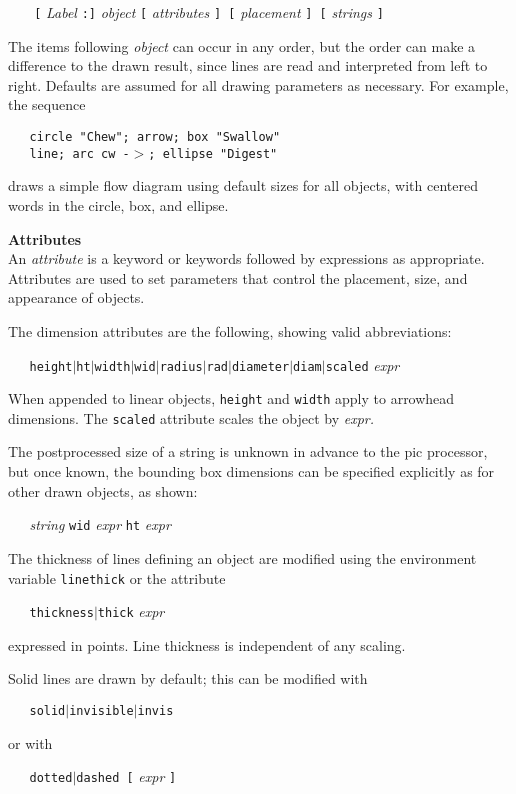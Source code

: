{\it \ \ \ }
{\tt [}
{\it Label}
{\tt :]}
{\it object}
{\tt [}
{\it attributes}
{\tt ]\ [}
{\it placement}
{\tt ]\ [}
{\it strings}
{\tt ]}

The items following
{\it object}
can occur in any order, but the order can make a difference to the
drawn result, since lines are read and interpreted from left to right.
Defaults are assumed for all drawing parameters as necessary.
For example, the sequence

{\tt \ \ \ circle {\tt "}Chew{\tt "}; arrow; box {\tt "}Swallow{\tt "}}
\\\hbox{}\hskip-1pt
{\tt \ \ \ line;\ arc\ cw\ -$>$;\ ellipse\ {\tt "}Digest{\tt "}}

draws a simple flow diagram using default sizes for all objects,
with centered words in the circle, box, and ellipse. 
%
\par\hskip-2pc{\bf Attributes}\\
An
{\it attribute}
is a keyword or keywords followed by expressions as appropriate.
Attributes are used to set parameters that control the placement,
size, and appearance of objects.

The dimension attributes are
the following, showing valid abbreviations:

{\tt \ \ \ height$|$ht$|$width$|$wid$|$radius$|$rad$|$diameter$|$diam$|$scaled}
{\it expr}

When appended to linear objects,
{\tt height}
and
{\tt width}
apply to arrowhead dimensions.
The
{\tt scaled}
attribute scales the object by
{\it expr.}

The postprocessed size of a string is unknown in advance to the
pic
processor, but once known, the bounding box dimensions can be specified
explicitly as for other drawn objects, as shown:

{\it \ \ \ string}
{\tt wid}
{\it expr}
{\tt ht}
{\it expr}

The thickness of lines defining an object are modified using
the environment variable
{\tt linethick}
or the attribute

{\tt \ \ \ thickness$|$thick}
{\it expr}

expressed in points.
Line thickness is independent of any scaling.

Solid lines are drawn by default; this can be modified with

{\tt \ \ \ solid$|$invisible$|$invis}

or with

{\tt \ \ \ dotted$|$dashed\ [}
{\it expr}
{\tt ]}

